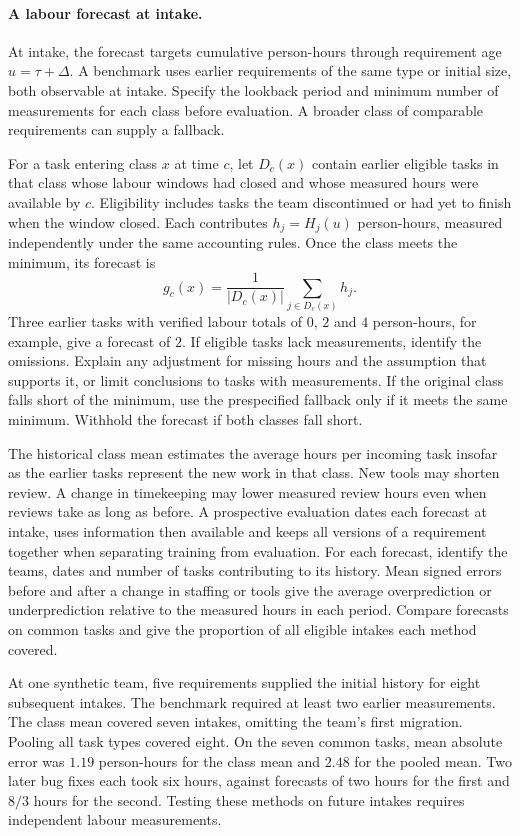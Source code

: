 \paragraph{A labour forecast at intake.}
\label{par:labour-reference}
At intake, the forecast targets cumulative person-hours through requirement age $u=\tau+\Delta$. A benchmark uses earlier requirements of the same type or initial size, both observable at intake. Specify the lookback period and minimum number of measurements for each class before evaluation. A broader class of comparable requirements can supply a fallback.

For a task entering class $x$ at time $c$, let $D_c(x)$ contain earlier eligible tasks in that class whose labour windows had closed and whose measured hours were available by $c$. Eligibility includes tasks the team discontinued or had yet to finish when the window closed. Each contributes $h_j=H_j(u)$ person-hours, measured independently under the same accounting rules. Once the class meets the minimum, its forecast is
\[
 g_c(x)=\frac{1}{|D_c(x)|}\sum_{j\in D_c(x)}h_j .
\]
Three earlier tasks with verified labour totals of $0$, $2$ and $4$ person-hours, for example, give a forecast of $2$. If eligible tasks lack measurements, identify the omissions. Explain any adjustment for missing hours and the assumption that supports it, or limit conclusions to tasks with measurements. If the original class falls short of the minimum, use the prespecified fallback only if it meets the same minimum. Withhold the forecast if both classes fall short.

The historical class mean estimates the average hours per incoming task insofar as the earlier tasks represent the new work in that class. New tools may shorten review. A change in timekeeping may lower measured review hours even when reviews take as long as before. A prospective evaluation dates each forecast at intake, uses information then available and keeps all versions of a requirement together when separating training from evaluation. For each forecast, identify the teams, dates and number of tasks contributing to its history. Mean signed errors before and after a change in staffing or tools give the average overprediction or underprediction relative to the measured hours in each period. Compare forecasts on common tasks and give the proportion of all eligible intakes each method covered.

At one synthetic team, five requirements supplied the initial history for eight subsequent intakes. The benchmark required at least two earlier measurements. The class mean covered seven intakes, omitting the team's first migration. Pooling all task types covered eight. On the seven common tasks, mean absolute error was $1.19$ person-hours for the class mean and $2.48$ for the pooled mean. Two later bug fixes each took six hours, against forecasts of two hours for the first and $8/3$ hours for the second. Testing these methods on future intakes requires independent labour measurements.

